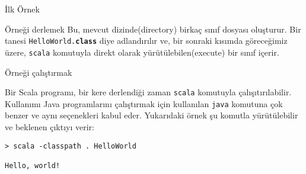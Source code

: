 \documentclass[10pt,a4paper]{book}
\begin{document}
\begin{chapter}{İlk Örnek}
\begin{section}{Örneği derlemek}
Bu, mevcut dizinde(directory) birkaç sınıf dosyası oluşturur. Bir tanesi \texttt{HelloWorld.\textbf{class}} diye adlandırılır ve, bir sonraki kısımda göreceğimiz üzere, \texttt{scala} komutuyla direkt olarak yürütülebilen(execute) bir sınıf içerir.

\end{section}

\begin{section}{Örneği çalıştırmak}

Bir Scala programı, bir kere derlendiği zaman \texttt{scala} komutuyla çalışıtırılabilir. Kullanımı Java programlarını çalıştırmak için kullanılan \texttt{java} komutuna çok benzer ve aynı seçenekleri kabul eder. Yukarıdaki örnek şu komutla yürütülebilir ve beklenen çıktıyı verir:

\begin{verbatim}
> scala -classpath . HelloWorld

Hello, world!
\end{verbatim}
\end{section}
\end{chapter}
\end{document}
